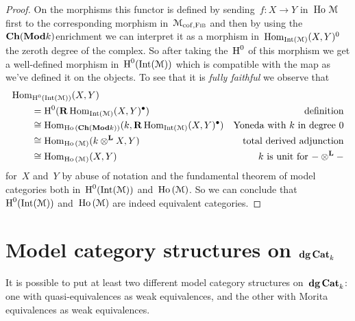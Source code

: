 \begin{refsection}
\begin{proposition}
\begin{proof}
    On the morphisms this functor is defined by sending~$f\colon X\to Y$ in~$\operatorname{\mathrm{Ho} \,}\mathcal{M}$ first to the corresponding morphism in~$\mathcal{M}_{\mathrm{cof},\textsc{Fib}}$ and then by using the~$\mathbf{Ch}(\mathbf{Mod}{k})$\dash enrichment we can interpret it as a morphism in~$\mathrm{Hom}_{\operatorname{Int}(\mathcal{M})}(X,Y)^0$ the zeroth degree of the complex. So after taking the~$\operatorname{H}^0$ of this morphism we get a well-defined morphism in~$\operatorname{H}^0(\operatorname{Int}(\mathcal{M}))$ which is compatible with the map as we've defined it on the objects. To see that it is \emph{fully faithful} we observe that
    \begin{equation}
      \begin{aligned}
        &\mathrm{Hom}_{\operatorname{H}^0(\operatorname{Int}(\mathcal{M}))}(X,Y) \\
        &\qquad=\operatorname{H}^0(\operatorname{\mathbf{R}}\mathrm{Hom}_{\operatorname{Int}(\mathcal{M})}(X,Y)^\bullet) & \text{definition} \\ 
        &\qquad\cong\mathrm{Hom}_{\operatorname{\mathrm{Ho} \,}(\mathbf{Ch}(\mathbf{Mod}{k}))}(k,\operatorname{\mathbf{R}}\mathrm{Hom}_{\operatorname{Int}(\mathcal{M})}(X,Y)^\bullet) & \text{Yoneda with~$k$ in degree 0} \\
        &\qquad\cong\mathrm{Hom}_{\operatorname{\mathrm{Ho} \,}(\mathcal{M})}(k\otimes^{\mathbf{L}} X,Y) & \text{total derived adjunction} \\
        &\qquad\cong\mathrm{Hom}_{\operatorname{\mathrm{Ho} \,}(\mathcal{M})}(X,Y) & \text{$k$ is unit for~$-\otimes^{\mathbf{L}}-$}
      \end{aligned}
    \end{equation}
    for~$X$ and~$Y$ by abuse of notation and the fundamental theorem of model categories both in~$\operatorname{H}^0(\operatorname{Int}(\mathcal{M}))$ and~$\operatorname{\mathrm{Ho} \,}(\mathcal{M})$. So we can conclude that~$\operatorname{H}^0(\operatorname{Int}(\mathcal{M}))$ and~$\operatorname{\mathrm{Ho} \,}(\mathcal{M})$ are indeed equivalent categories.
  \end{proof}
\end{proposition}


\section{Model category structures on \texorpdfstring{$\mathbf{dg\,Cat}_k$}{dgCat\textunderscore k}}
It is possible to put at least two different model category structures on~$\mathbf{dg\,Cat}_k$: one with quasi-equivalences as weak equivalences, and the other with Morita equivalences as weak equivalences.


\end{refsection}
